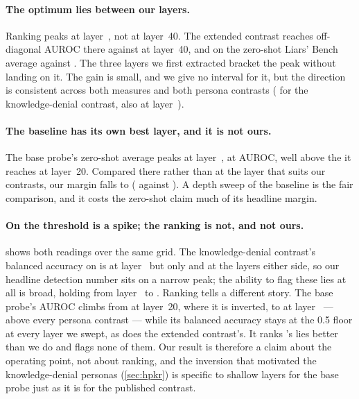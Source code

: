 \paragraph{The optimum lies between our layers.} Ranking peaks at
layer~, not at layer~40. The extended contrast reaches
 off-diagonal AUROC there against  at layer~40, and
 on the zero-shot Liars' Bench average against . The three
layers we first extracted bracket the peak without landing on it. The gain is small, and we give
no interval for it, but the direction is consistent across both measures and both persona
contrasts ( for the knowledge-denial contrast, also at
layer~).

\paragraph{The baseline has its own best layer, and it is not ours.} The base probe's zero-shot
average peaks at layer~, at  AUROC, well above
the  it reaches at layer~20. Compared there rather than at the layer that suits
our contrasts, our margin falls to 
( against ). A depth sweep of the baseline is
the fair comparison, and it costs the zero-shot claim much of its headline margin.

\paragraph{On \hpkr{} the threshold is a spike; the ranking is not, and not ours.}
 shows both readings over the same grid. The
knowledge-denial contrast's balanced accuracy on \hpkr{} is  at
layer~ but only  and
 at the layers either side, so our headline detection number sits on
a narrow peak; the ability to flag these lies at all is broad, holding from
layer~ to . Ranking tells a different
story. The base probe's \hpkr{} AUROC climbs from  at layer~20, where it is
inverted, to  at layer~ --- above
every persona contrast --- while its balanced accuracy stays at the 0.5 floor at every layer we
swept, as does the extended contrast's. It ranks \hpkr{}'s lies better than we do and flags none of
them. Our \hpkr{} result is therefore a claim about the operating point, not about ranking, and the
inversion that motivated the knowledge-denial personas (\cref{sec:hpkr}) is specific to shallow
layers for the base probe just as it is for the published contrast.

